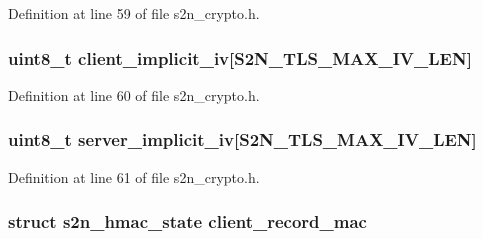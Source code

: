 Definition at line 59 of file s2n\+\_\+crypto.\+h.

\subsubsection[{\texorpdfstring{client\+\_\+implicit\+\_\+iv}{client_implicit_iv}}]{\setlength{\rightskip}{0pt plus 5cm}uint8\+\_\+t client\+\_\+implicit\+\_\+iv\mbox{[}{\bf S2\+N\+\_\+\+T\+L\+S\+\_\+\+M\+A\+X\+\_\+\+I\+V\+\_\+\+L\+EN}\mbox{]}}\hypertarget{structs2n__crypto__parameters_ac38c4c9618058e6ca7f9fef4c7ea6048}{}\label{structs2n__crypto__parameters_ac38c4c9618058e6ca7f9fef4c7ea6048}


Definition at line 60 of file s2n\+\_\+crypto.\+h.

\subsubsection[{\texorpdfstring{server\+\_\+implicit\+\_\+iv}{server_implicit_iv}}]{\setlength{\rightskip}{0pt plus 5cm}uint8\+\_\+t server\+\_\+implicit\+\_\+iv\mbox{[}{\bf S2\+N\+\_\+\+T\+L\+S\+\_\+\+M\+A\+X\+\_\+\+I\+V\+\_\+\+L\+EN}\mbox{]}}\hypertarget{structs2n__crypto__parameters_a6f73f56517df7d3ff20e29a89d24bbd0}{}\label{structs2n__crypto__parameters_a6f73f56517df7d3ff20e29a89d24bbd0}


Definition at line 61 of file s2n\+\_\+crypto.\+h.

\subsubsection[{\texorpdfstring{client\+\_\+record\+\_\+mac}{client_record_mac}}]{\setlength{\rightskip}{0pt plus 5cm}struct {\bf s2n\+\_\+hmac\+\_\+state} client\+\_\+record\+\_\+mac}\hypertarget{structs2n__crypto__parameters_a9e84d70c1483dbddcb35a95aca818166}{}\label{structs2n__crypto__parameters_a9e84d70c1483dbddcb35a95aca818166}


